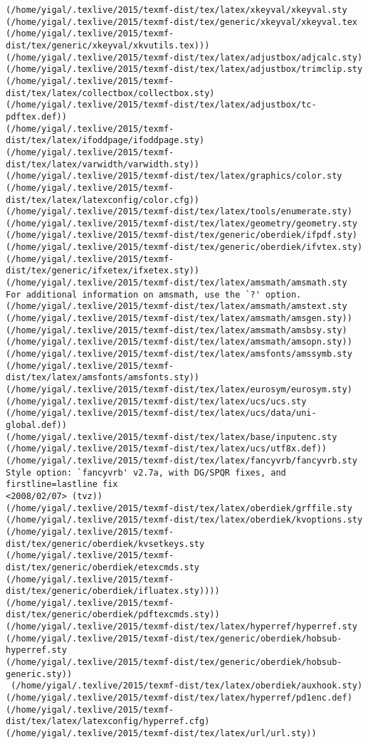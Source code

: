 \documentclass{article}
\begin{document}
\begin{Verbatim}[commandchars=\\\{\}]
(/home/yigal/.texlive/2015/texmf-dist/tex/latex/xkeyval/xkeyval.sty
(/home/yigal/.texlive/2015/texmf-dist/tex/generic/xkeyval/xkeyval.tex
(/home/yigal/.texlive/2015/texmf-dist/tex/generic/xkeyval/xkvutils.tex)))
(/home/yigal/.texlive/2015/texmf-dist/tex/latex/adjustbox/adjcalc.sty)
(/home/yigal/.texlive/2015/texmf-dist/tex/latex/adjustbox/trimclip.sty
(/home/yigal/.texlive/2015/texmf-dist/tex/latex/collectbox/collectbox.sty)
(/home/yigal/.texlive/2015/texmf-dist/tex/latex/adjustbox/tc-pdftex.def))
(/home/yigal/.texlive/2015/texmf-dist/tex/latex/ifoddpage/ifoddpage.sty)
(/home/yigal/.texlive/2015/texmf-dist/tex/latex/varwidth/varwidth.sty))
(/home/yigal/.texlive/2015/texmf-dist/tex/latex/graphics/color.sty
(/home/yigal/.texlive/2015/texmf-dist/tex/latex/latexconfig/color.cfg))
(/home/yigal/.texlive/2015/texmf-dist/tex/latex/tools/enumerate.sty)
(/home/yigal/.texlive/2015/texmf-dist/tex/latex/geometry/geometry.sty
(/home/yigal/.texlive/2015/texmf-dist/tex/generic/oberdiek/ifpdf.sty)
(/home/yigal/.texlive/2015/texmf-dist/tex/generic/oberdiek/ifvtex.sty)
(/home/yigal/.texlive/2015/texmf-dist/tex/generic/ifxetex/ifxetex.sty))
(/home/yigal/.texlive/2015/texmf-dist/tex/latex/amsmath/amsmath.sty
For additional information on amsmath, use the `?' option.
(/home/yigal/.texlive/2015/texmf-dist/tex/latex/amsmath/amstext.sty
(/home/yigal/.texlive/2015/texmf-dist/tex/latex/amsmath/amsgen.sty))
(/home/yigal/.texlive/2015/texmf-dist/tex/latex/amsmath/amsbsy.sty)
(/home/yigal/.texlive/2015/texmf-dist/tex/latex/amsmath/amsopn.sty))
(/home/yigal/.texlive/2015/texmf-dist/tex/latex/amsfonts/amssymb.sty
(/home/yigal/.texlive/2015/texmf-dist/tex/latex/amsfonts/amsfonts.sty))
(/home/yigal/.texlive/2015/texmf-dist/tex/latex/eurosym/eurosym.sty)
(/home/yigal/.texlive/2015/texmf-dist/tex/latex/ucs/ucs.sty
(/home/yigal/.texlive/2015/texmf-dist/tex/latex/ucs/data/uni-global.def))
(/home/yigal/.texlive/2015/texmf-dist/tex/latex/base/inputenc.sty
(/home/yigal/.texlive/2015/texmf-dist/tex/latex/ucs/utf8x.def))
(/home/yigal/.texlive/2015/texmf-dist/tex/latex/fancyvrb/fancyvrb.sty
Style option: `fancyvrb' v2.7a, with DG/SPQR fixes, and firstline=lastline fix 
<2008/02/07> (tvz))
(/home/yigal/.texlive/2015/texmf-dist/tex/latex/oberdiek/grffile.sty
(/home/yigal/.texlive/2015/texmf-dist/tex/latex/oberdiek/kvoptions.sty
(/home/yigal/.texlive/2015/texmf-dist/tex/generic/oberdiek/kvsetkeys.sty
(/home/yigal/.texlive/2015/texmf-dist/tex/generic/oberdiek/etexcmds.sty
(/home/yigal/.texlive/2015/texmf-dist/tex/generic/oberdiek/ifluatex.sty))))
(/home/yigal/.texlive/2015/texmf-dist/tex/generic/oberdiek/pdftexcmds.sty))
(/home/yigal/.texlive/2015/texmf-dist/tex/latex/hyperref/hyperref.sty
(/home/yigal/.texlive/2015/texmf-dist/tex/generic/oberdiek/hobsub-hyperref.sty
(/home/yigal/.texlive/2015/texmf-dist/tex/generic/oberdiek/hobsub-generic.sty))
 (/home/yigal/.texlive/2015/texmf-dist/tex/latex/oberdiek/auxhook.sty)
(/home/yigal/.texlive/2015/texmf-dist/tex/latex/hyperref/pd1enc.def)
(/home/yigal/.texlive/2015/texmf-dist/tex/latex/latexconfig/hyperref.cfg)
(/home/yigal/.texlive/2015/texmf-dist/tex/latex/url/url.sty))


\end{Verbatim}
\end{document}
